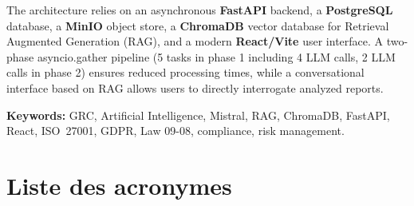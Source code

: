 \documentclass[a4paper,12pt,oneside]{report}
\begin{document}
	The architecture relies on an asynchronous \textbf{FastAPI} backend, a \textbf{PostgreSQL} database, a \textbf{MinIO} object store, a \textbf{ChromaDB} vector database for Retrieval Augmented Generation (RAG), and a modern \textbf{React/Vite} user interface. A two-phase asyncio.gather pipeline (5 tasks in phase 1 including 4 LLM calls, 2 LLM calls in phase 2) ensures reduced processing times, while a conversational interface based on RAG allows users to directly interrogate analyzed reports.
	
	\medskip
	\textbf{Keywords:} GRC, Artificial Intelligence, Mistral, RAG, ChromaDB, FastAPI, React, ISO~27001, GDPR, Law 09-08, compliance, risk management.
	
	\renewcommand{\contentsname}{Table des mati\`eres}
	\tableofcontents
	\listoffigures
	\listoftables
	
	\chapter*{Liste des acronymes}
	
\end{document}
